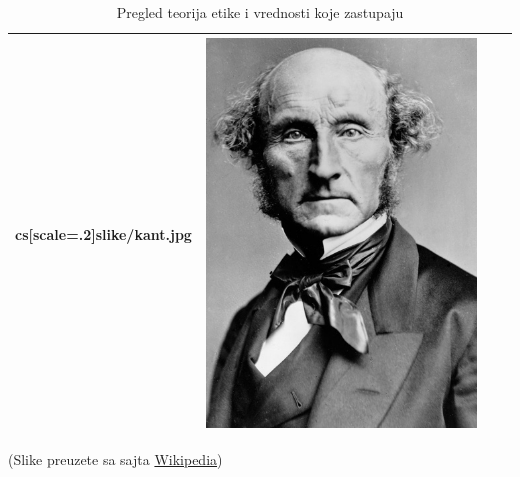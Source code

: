 \documentclass[a4paper]{article}
\begin{document}
\begin{table}
\begin{center}
\begin{tabular}{|l|c|c|c|}
cs[scale=.2]{slike/kant.jpg} & \includegraphics[scale=.2]{slike/mil.jpg} \\
\hline
\end{tabular}
\label{tab:tabela1}
\caption{{Pregled teorija etike i vrednosti koje zastupaju}}
(Slike preuzete sa sajta \href{http://en.wikipedia.org}{Wikipedia})
\end{center}
\end{table}
\end{document}
